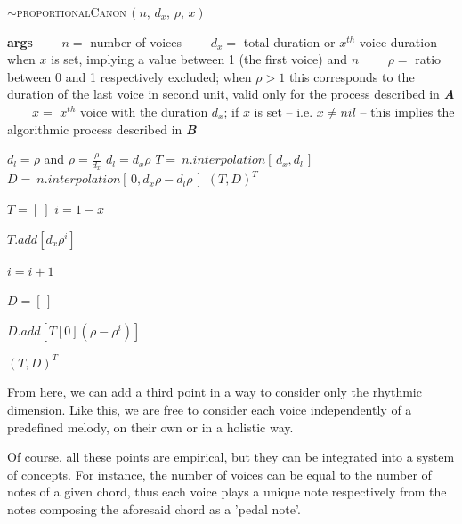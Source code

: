 \begin{algorithm}[H]
\caption{$\sim$\textsc{proportionalCanon}$\,(n,\, d_x,\, \rho,\, x)$}\label{ldwd}
\begin{algorithmic}%
\State \textbf{args}
\State $\qquad n =$ number of voices
\State $\qquad d_x =$ total duration or $x^{th}$ voice duration when $x$ is set, implying a value between 1 (the first voice) and $n$
\State $\qquad \rho =$ ratio between 0 and 1 respectively excluded; when $\rho > 1$ this corresponds to the duration of the last voice in second unit, valid only for the process described in \textbf{\textit{A}}
\State $\qquad x =$  $x^{th}$ voice with the duration $d_x$; if $x$ is set -- i.e. $x \neq nil$ -- this implies the algorithmic process described in \textbf{\textit{B}}
\State

\State
{}
\State {}
\State $d_l=\rho$ and $\rho=\frac{\rho}{d_x}$
\State \Else
\State $d_l= d_x \rho$
\State \EndIf
\State $T =\:  n.interpolation[\,d_x, d_l \,]$
\State $D = \: n.interpolation[\,0,  d_x \rho -  d_l \rho\,]$
\State
\Return $(T, D)^T$
\State

\Else
{}

\State $T=[\:]$
\State $i =1-x$

\State $T.add\left [d_x \rho ^i\right ]$

\State $i=i+1$
\EndWhile

\State
\State $D=[\,]$

\State $D.add\left [ T[0] (\rho-\rho^i)  \right ]$

\EndFor
\State
\Return $(T,D)^T$
\EndIf

\end{algorithmic}
\end{algorithm}

From here, we can add a third point in a way to consider only the rhythmic dimension. Like this, we are free to consider each voice independently of a predefined melody, on their own or in a holistic way.

Of course, all these points are empirical, but they can be integrated into a system of concepts.
For instance, the number of voices can be equal to the number of notes of a given chord, thus each voice plays a unique note respectively from the notes composing the aforesaid chord as a 'pedal note'.

